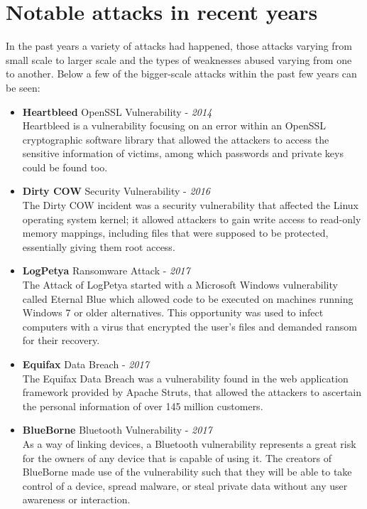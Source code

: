 \section{Notable attacks in recent years}

In the past years a variety of attacks had happened, those attacks varying from small scale to larger scale and the types of weaknesses abused varying from one to another. Below a few of the bigger-scale attacks within the past few years can be seen:


\begin{itemize}
    \item \textbf{Heartbleed} OpenSSL Vulnerability - \textit{2014} \cite{durumeric2014matter} \\
    Heartbleed is a vulnerability focusing on an error within an OpenSSL cryptographic software library that allowed the attackers to access the sensitive information of victims, among which passwords and private keys could be found too. 

    \item \textbf{Dirty COW} Security Vulnerability - \textit{2016} \cite{saleel2017linux} \\
    The Dirty COW incident was a security vulnerability that affected the Linux operating system kernel; it allowed attackers to gain write access to read-only memory mappings, including files that were supposed to be protected, essentially giving them root access.

    \item \textbf{LogPetya} Ransomware Attack - \textit{2017} \cite{aidan2017comprehensive} \\
    The Attack of LogPetya started with a Microsoft Windows vulnerability called Eternal Blue which allowed code to be executed on machines running Windows 7 or older alternatives. This opportunity was used to infect computers with a virus that encrypted the user's files and demanded ransom for their recovery.

    \item \textbf{Equifax} Data Breach - \textit{2017} \cite{berghel2017equifax} \\
    The Equifax Data Breach was a vulnerability found in the web application framework provided by Apache Struts, that allowed the attackers to ascertain the personal information of over 145 million customers.

    \item \textbf{BlueBorne} Bluetooth Vulnerability - \textit{2017} \cite{seri2019exploiting} \\
    As a way of linking devices, a Bluetooth vulnerability represents a great risk for the owners of any device that is capable of using it. The creators of BlueBorne made use of the vulnerability such that they will be able to take control of a device, spread malware, or steal private data without any user awareness or interaction.


\end{itemize}
